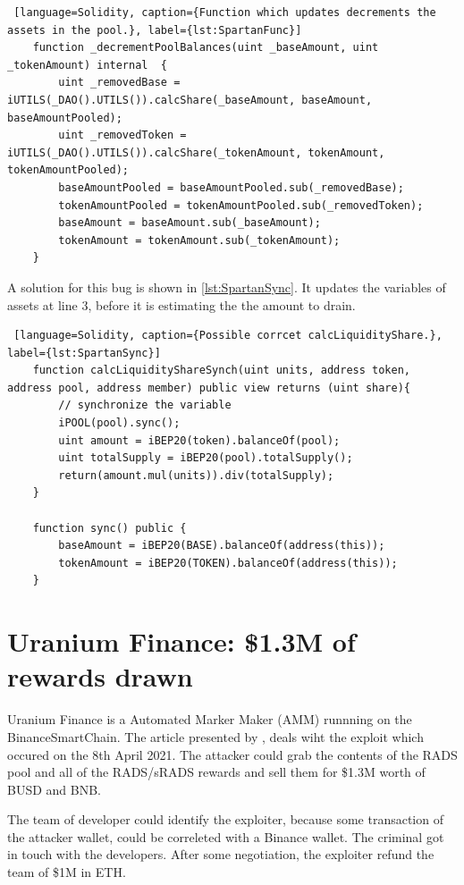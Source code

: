 \begin{lstlisting} [language=Solidity, caption={Function which updates decrements the assets in the pool.}, label={lst:SpartanFunc}]
    function _decrementPoolBalances(uint _baseAmount, uint _tokenAmount) internal  {
        uint _removedBase = iUTILS(_DAO().UTILS()).calcShare(_baseAmount, baseAmount, baseAmountPooled);
        uint _removedToken = iUTILS(_DAO().UTILS()).calcShare(_tokenAmount, tokenAmount, tokenAmountPooled);
        baseAmountPooled = baseAmountPooled.sub(_removedBase);
        tokenAmountPooled = tokenAmountPooled.sub(_removedToken); 
        baseAmount = baseAmount.sub(_baseAmount);
        tokenAmount = tokenAmount.sub(_tokenAmount); 
    }
\end{lstlisting}
A solution for this bug is shown in \autoref{lst:SpartanSync}. It updates the variables of assets at line 3, before it is estimating the 
the amount to drain.
\begin{lstlisting} [language=Solidity, caption={Possible corrcet calcLiquidityShare.}, label={lst:SpartanSync}]
    function calcLiquidityShareSynch(uint units, address token, address pool, address member) public view returns (uint share){
        // synchronize the variable
        iPOOL(pool).sync();  
        uint amount = iBEP20(token).balanceOf(pool);
        uint totalSupply = iBEP20(pool).totalSupply();
        return(amount.mul(units)).div(totalSupply);
    }

    function sync() public {
        baseAmount = iBEP20(BASE).balanceOf(address(this));
        tokenAmount = iBEP20(TOKEN).balanceOf(address(this));
    }

\end{lstlisting}
\section{Uranium Finance: \$1.3M of rewards drawn}   
\label{sec:Exploits:Uranium}
Uranium Finance is a Automated Marker Maker (AMM) runnning on the BinanceSmartChain.
The article presented by \citet{UraniumPM}, deals wiht the exploit which occured on the 
8th April 2021. The attacker could grab the contents of the RADS pool and all of the RADS/sRADS rewards 
and sell them for \$1.3M worth of BUSD and BNB.

The team of developer could identify the exploiter, because some transaction of the attacker wallet, could be 
correleted with a Binance wallet. The criminal got in touch with the developers. After some negotiation, 
the exploiter refund the team of \$1M in ETH.

